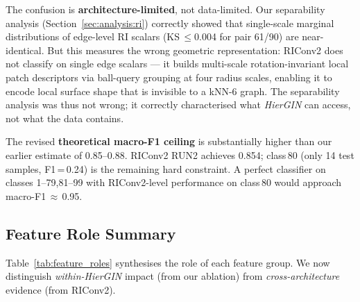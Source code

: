 The confusion is \textbf{architecture-limited}, not data-limited.
Our separability analysis (Section~\ref{sec:analysis:ri}) correctly showed
that single-scale marginal distributions of edge-level RI scalars
(KS\,$\leq$0.004 for pair 61/90) are near-identical.
But this measures the wrong geometric representation: RIConv2 does not
classify on single edge scalars --- it builds multi-scale rotation-invariant
local patch descriptors via ball-query grouping at four radius scales,
enabling it to encode local surface shape that is invisible to a kNN-6 graph.
The separability analysis was thus not wrong; it correctly characterised what
\textit{HierGIN} can access, not what the data contains.

The revised \textbf{theoretical macro-F1 ceiling} is substantially higher than
our earlier estimate of 0.85--0.88.
RIConv2 RUN2 achieves 0.854; class\,80 (only 14 test samples, F1\,=\,0.24) is
the remaining hard constraint.
A perfect classifier on classes 1--79,81--99 with RIConv2-level performance on
class\,80 would approach macro-F1\,$\approx$\,0.95.

\subsection{Feature Role Summary}

Table~\ref{tab:feature_roles} synthesises the role of each feature group.
We now distinguish \textit{within-HierGIN} impact (from our ablation) from
\textit{cross-architecture} evidence (from RIConv2).

